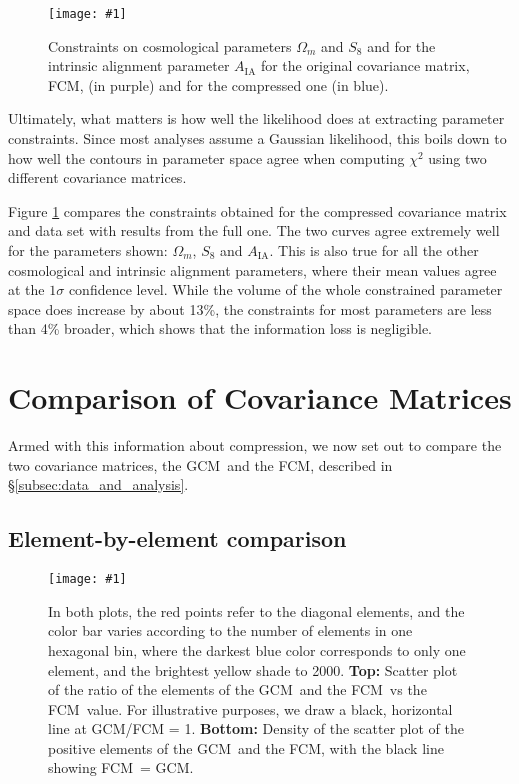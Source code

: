 \documentclass[twocolumn,nofootinbib]{\docclass}
\newcommand{\sfig}[2]{
	\texttt{[image: \#1]}
}
\newcommand{\Sfig}[3]{
	\begin{figure}[#1]
		\sfig{../figures/#2.pdf}{\columnwidth}
		\caption{#3}
		\label{fig:#2}
	\end{figure}
}
\newcommand{\rf}[1]{Figure \ref{fig:#1}}
\newcommand{\rssec}[1]{\S\ref{subsec:#1}}
\newcommand\full{the FCM}
\newcommand\gaussian{the GCM}
\begin{document}
\Sfig{b}{Comp2pt-constraints_wmS8A}{Constraints on cosmological parameters $\Omega_m$ and $S_8$ and for the intrinsic alignment parameter $A_{\text{IA}}$ for the original covariance matrix, FCM, (in purple) and for the compressed one (in blue).}

Ultimately, what matters is how well the likelihood does at extracting parameter constraints. Since most analyses assume a Gaussian likelihood, this boils down to how well the contours in parameter space agree when computing $\chi^2$ using two different covariance matrices.	

\rf{Comp2pt-constraints_wmS8A} compares the constraints obtained for the compressed covariance matrix and data set with results from the full one. The two curves agree extremely well for the parameters shown: $\Omega_m$, $S_8$ and $A_{\text{IA}}$. This is also true for all the other cosmological and intrinsic alignment parameters, where their mean values agree at the $1 \sigma$ confidence level. While the volume of the whole constrained parameter space does increase by about 13\%, the constraints for most parameters are less than 4\% broader, which shows that the information loss is negligible.

\section{Comparison of Covariance Matrices}
\label{sec:comparison_matrices}

Armed with this information about compression, we now set out to compare the two covariance matrices, \gaussian\ and \full, described in \rssec{data_and_analysis}.

\subsection{Element-by-element comparison}
\label{subsec:compare_one-one}

\Sfig{thbp}{Y1-scatter}{In both plots, the red points refer to the diagonal elements, and the color bar varies according to the number of elements in one hexagonal bin, where the darkest blue color corresponds to only one element, and the brightest yellow shade to 2000. \textbf{Top:} Scatter plot of the ratio of the elements of \gaussian\ and \full\ vs \full\ value. For illustrative purposes, we draw a black, horizontal line at GCM/FCM = 1. \textbf{Bottom:} Density of the scatter plot of the positive elements of \gaussian\ and \full, with the black line showing FCM\ = GCM.}
\end{document}
